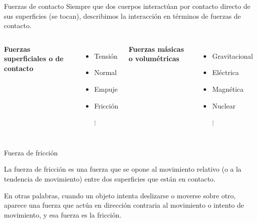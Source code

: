 \begin{frame}{Fuerzas de contacto}
    Siempre que dos cuerpos interactúan por contacto directo de sus superficies (se tocan), describimos la interacción en términos de fuerzas de contacto.
    \vspace{1em}
    
    \begin{columns}
        \textbf{Fuerzas superficiales o de contacto}
        \vspace{1em}
        \begin{itemize}
            \item Tensión
            \item Normal
            \item Empuje
            \item Fricción

            $\vdots$
        \end{itemize}
        \textbf{Fuerzas másicas o volumétricas}
        \vspace{1em}

        \begin{itemize}
            \item Gravitacional
            \item Eléctrica
            \item Magnética
            \item Nuclear

            $\vdots$
        \end{itemize}
        
    \end{columns}
\end{frame}

\begin{frame}{Fuerza de fricción}

La fuerza de fricción es una fuerza que se opone al movimiento relativo (o a la tendencia de movimiento) entre dos superficies que están en contacto.

En otras palabras, cuando un objeto intenta deslizarse o moverse sobre otro, aparece una fuerza que actúa en dirección contraria al movimiento o intento de movimiento, y esa fuerza es la fricción.
    
\end{frame}

